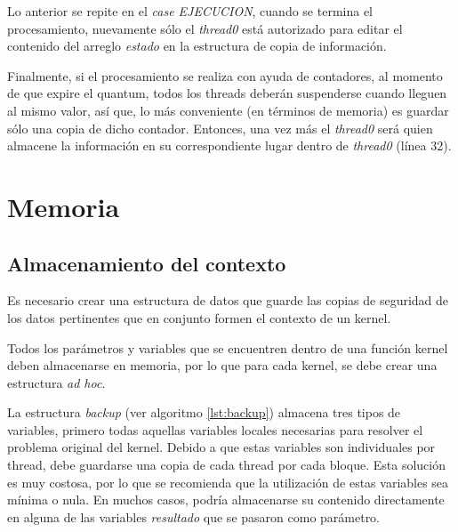 Lo anterior se repite en el \textit{case EJECUCION}, cuando se termina el procesamiento, nuevamente sólo el \textit{thread0} está autorizado para editar el contenido del arreglo \textit{estado} en la estructura de copia de información.
\newline

Finalmente, si el procesamiento se realiza con ayuda de contadores, al momento de que expire el quantum, todos los threads deberán suspenderse cuando lleguen al mismo valor, así que, lo más conveniente (en términos de memoria) es guardar sólo una copia de dicho contador. Entonces, una vez más el \textit{thread0} será quien almacene la información en su correspondiente lugar dentro de \textit{thread0} (línea 32).


  \section{Memoria}\label{secc:memoria}

  \subsection{Almacenamiento del contexto}

Es necesario crear una estructura de datos que guarde las copias de seguridad de los datos pertinentes que en conjunto formen el contexto de un kernel.
\newline

Todos los parámetros y variables que se encuentren dentro de una función kernel deben almacenarse en memoria, por lo que para cada kernel, se debe crear una estructura \textit{ad hoc}.
\newline



La estructura \textit{backup} (ver algoritmo \ref{lst:backup}) almacena tres tipos de variables, primero todas aquellas variables locales necesarias para resolver el problema original del kernel. Debido a que estas variables son individuales por thread, debe guardarse una copia de cada thread por cada bloque. Esta solución es muy costosa, por lo que se recomienda que la utilización de estas variables sea mínima o nula. En muchos casos, podría almacenarse su contenido directamente en alguna de las variables \textit{resultado} que se pasaron como parámetro.
\newline

